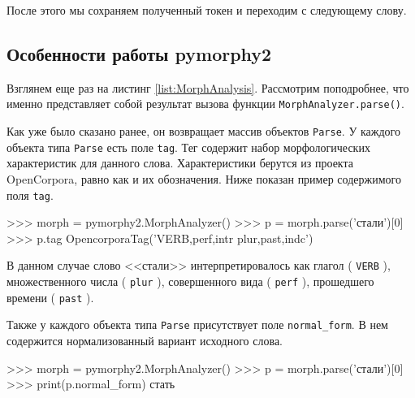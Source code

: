 После этого мы сохраняем полученный токен и переходим с следующему слову.

\subsection{Особенности работы pymorphy2}
Взглянем еще раз на листинг \ref{list:MorphAnalysis}. Рассмотрим поподробнее, что именно представляет собой результат вызова функции \lstinline{MorphAnalyzer.parse()}. 

Как уже было сказано ранее, он возвращает массив объектов \lstinline{Parse}. У каждого объекта типа \lstinline{Parse} есть поле \lstinline{tag}. Тег содержит набор морфологических характеристик для данного слова. Характеристики берутся из проекта OpenCorpora, равно как и их обозначения. Ниже показан пример содержимого поля \lstinline{tag}.
\begin{Verb}
>>> morph = pymorphy2.MorphAnalyzer()
>>> p = morph.parse('стали')[0]
>>> p.tag
OpencorporaTag('VERB,perf,intr plur,past,indc')
\end{Verb}
В данном случае слово <<стали>> интерпретировалось как глагол ( \lstinline{VERB} ), множественного числа ( \lstinline{plur} ), совершенного вида ( \lstinline{perf} ), прошедшего времени ( \lstinline{past} ).

Также у каждого объекта типа \lstinline{Parse} присутствует поле \lstinline{normal_form}. В нем содержится нормализованный вариант исходного слова.
\begin{Verb}
>>> morph = pymorphy2.MorphAnalyzer()
>>> p = morph.parse('стали')[0]
>>> print(p.normal_form)
стать
\end{Verb}

